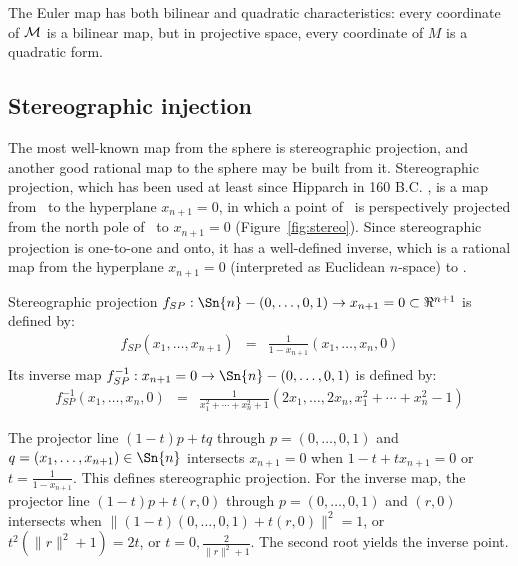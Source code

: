 \documentclass[11pt]{article}
\begin{document}
The Euler map has both bilinear and quadratic characteristics:
every coordinate of ${\cal M}$ is a bilinear map,
but in projective space, every coordinate of $M$ is a quadratic form.

\subsection{Stereographic injection}

The most well-known map from the sphere is stereographic projection,
and another good rational map to the sphere may be built from it.
Stereographic projection, which has been used at least since Hipparch in 160 B.C. 
\cite{kreyszig59}, %
is a map from \ to the hyperplane $x_{n+1}=0$,
in which a point of \ is perspectively projected from 
the north pole of \ to $x_{n+1}=0$  %
(Figure~\ref{fig:stereo}).
Since stereographic projection is one-to-one and onto, it has a well-defined inverse,
which is a rational map from the hyperplane $x_{n+1}=0$
(interpreted as Euclidean $n$-space)
to .


\begin{lemma}
Stereographic projection 
$f_{SP}: \Sn{n} - (0,\ldots,0,1) \rightarrow x_{n+1}=0 \subset \Re^{n+1}$ 
is defined by:
\begin{eqnarray*}
f_{SP}(x_1,\ldots,x_{n+1}) & = & \frac{1}{1-x_{n+1}} (x_1,\ldots,x_n,0) \\
\end{eqnarray*}	%
Its inverse map $f_{SP}^{-1}: x_{n+1}=0 \rightarrow \Sn{n} - (0,\ldots,0,1)$ 
is defined by:
\begin{eqnarray*}
f_{SP}^{-1}(x_1,\ldots,x_n,0) & = &
	\frac{1}{x_1^2 + \cdots + x_n^2 + 1} 
	(2x_1, \ldots, 2x_n, x_1^2 + \cdots + x_n^2 - 1)
\end{eqnarray*}	%
\end{lemma}
\vspace{.1in}
\prf
The projector line $(1-t)p + tq$ through $p = (0,\ldots,0,1)$ and 
$q = (x_1,\ldots,x_{n+1}) \in \Sn{n}$ intersects $x_{n+1}=0$ 
when $1-t + tx_{n+1} = 0$ or $t = \frac{1}{1-x_{n+1}}$.
This defines stereographic projection.
For the inverse map, the projector line $(1-t)p + t(r,0)$ through $p = (0,\ldots,0,1)$ 
and $(r,0)$ intersects  when $\|(1-t)(0,\ldots,0,1) + t(r,0)\|^2 = 1$,
or $t^2(\|r\|^2 + 1) = 2t$, or 
$t=0,\frac{2}{\|r\|^2 + 1}$.
The second root yields the inverse point.
\QED
\end{document}
